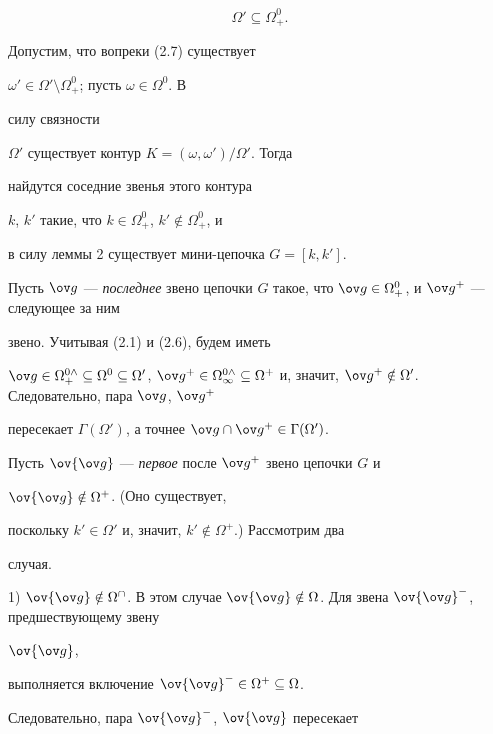 \begin{pf}
\begin{equation} 


\Omega'\subseteq\Omega^0_+. 


\end{equation} 


Допустим, что вопреки (2.7) существует 


$\omega'\in\Omega'\setminus\Omega^0_+$; пусть $\omega\in\Omega^0$. В 


силу связности 


$\Omega'$ существует контур $K=(\omega,\omega')/\Omega'$. Тогда 


найдутся соседние звенья этого контура 


$k$, $k'$ такие, что $k\in\Omega^0_+$, $k'\notin\Omega^0_+$, и 


в силу леммы 2 существует мини-цепочка $G=[k,k']$. 


Пусть $\ov g$ --- {\it последнее} звено цепочки $G$ такое, что $\ov 


g\in\Omega^0_+$, и $\ov g^+$ --- следующее за ним 


звено. Учитывая (2.1) и (2.6), будем иметь 


$\ov g\in\Omega^{0\wedge}_+\subseteq\Omega^0\subseteq\Omega'$, $\ov 


g^+\in\Omega^{0\wedge}_\infty\subseteq\Omega^+$ и, значит, $\ov 


g^+\notin\Omega'$. Следовательно, пара $\ov g$, $\ov g^+$ 


пересекает $\Gamma(\Omega')$, а точнее $\ov g\cap\ov 


g^+\in\Gamma(\Omega')$. 


 


Пусть $\ov{\ov g}$ --- {\it первое} после $\ov g^+$ звено цепочки $G$ и 


$\ov{\ov g}\notin\Omega^+$. (Оно существует, 


поскольку $k'\in\Omega'$ и, значит, $k'\notin\Omega^+$.) Рассмотрим два 


случая. 


 


1) $\ov{\ov g}\notin\Omega^\cap$. В этом случае $\ov{\ov 


g}\notin\Omega$. Для звена $\ov{\ov g}^-$, предшествующему звену 


$\ov{\ov g}$, 


выполняется включение $\ov{\ov g}^-\in\Omega^+\subseteq\Omega$. 


Следовательно, пара $\ov{\ov g}^-$, $\ov{\ov g}$ пересекает 



\end{pf}
